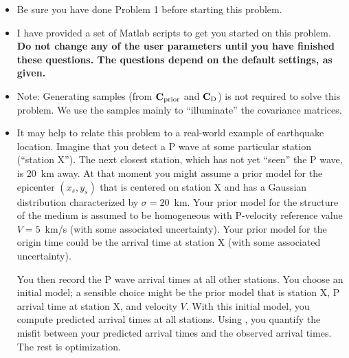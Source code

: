 \documentclass[11pt,titlepage,fleqn]{article}
\begin{document}
\begin{itemize}
\item Be sure you have done Problem 1 before starting this problem.

\item I have provided a set of Matlab scripts to get you started on this problem. {\bf Do not change any of the user parameters until you have finished these questions. The questions depend on the default settings, as given.}

\item Note: Generating samples (from $\mbox{${\bf C}$}_{\rm prior}$ and $\mbox{${\bf C}$}_{\rm D}$) is not required to solve this problem. We use the samples mainly to ``illuminate'' the covariance matrices.

\item It may help to relate this problem to a real-world example of earthquake location. Imagine that you detect a P wave at some particular station (``station X''). The next closest station, which has not yet ``seen'' the P wave, is 20~km away. At that moment you might assume a prior model for the epicenter $(x_s, y_s)$ that is centered on station X and has a Gaussian distribution characterized by $\sigma = 20$~km. 
Your prior model for the structure of the medium is assumed to be homogeneous with P-velocity reference value $V = 5$~km/s (with some associated uncertainty). Your prior model for the origin time could be the arrival time at station X (with some associated uncertainty).

You then record the P wave arrival times at all other stations. You choose an initial model; a sensible choice might be the prior model that is station X, P arrival time at station X, and velocity $V$. With this initial model, you compute predicted arrival times at all stations. Using , you quantify the misfit between your predicted arrival times and the observed arrival times. The rest is optimization.

\end{itemize}




\end{document}
